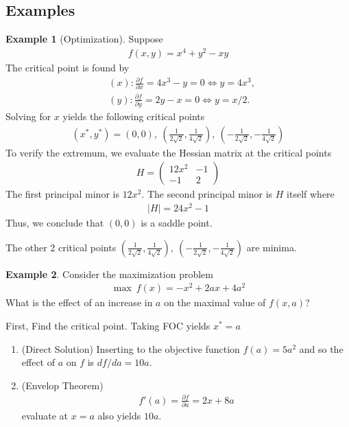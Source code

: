 \documentclass[11pt,a4paper]{book}
\theoremstyle{definition}\newtheorem{definition}{Definition}
\theoremstyle{definition}\newtheorem{fact}{Fact}
\theoremstyle{definition}\newtheorem{remark}{Remark}
\theoremstyle{definition}\newtheorem{ex}{Ex.}
\theoremstyle{definition}\newtheorem{project}{Project}
\theoremstyle{definition}\newtheorem{problem}{Problem}
\theoremstyle{definition}\newtheorem{example}{Example}
\numberwithin{theorem}{section}
\numberwithin{corollary}{chapter}
\numberwithin{assumption}{chapter}
\numberwithin{definition}{chapter}
\numberwithin{prop}{chapter}
\numberwithin{notation}{chapter}
\numberwithin{problem}{chapter}
\numberwithin{example}{chapter}
\numberwithin{fact}{chapter}
\numberwithin{ex}{chapter}
\begin{document}
	\subsection{Examples}
	
	\begin{example}[Optimization]
	\label{ex:soc2}
		Suppose
		\begin{align*}
			f(x,y) = x^4 + y^2 - xy 
		\end{align*}
		The critical point is found by
		\begin{align*}
			& (x): \frac{\partial f}{\partial x} = 4x^3 - y = 0 \iff y  = 4 x^3, \\
			& (y): \frac{\partial f}{\partial y} = 2y - x = 0 \iff y = x/2.      
		\end{align*}
		Solving for $x$ yields the following critical points
		\begin{align*}
			(x^*,y^*) = (0,0), \ (\frac{1}{2\sqrt{2}} , \frac{1}{4\sqrt{2}}  ), \ (-\frac{1}{2\sqrt{2}} , -\frac{1}{4\sqrt{2}}  ) 
		\end{align*}
		To verify the extremum, we evaluate the Hessian matrix at the critical points
		\begin{align*}
			H = \begin{pmatrix}
				12 x^2 & -1 \\
				-1     & 2  
			\end{pmatrix}
		\end{align*}
		The first principal minor is $12x^2$. The second principal minor is $H$ itself where
		\begin{align*}
			| H | = 24 x^2 - 1 
		\end{align*} 
		Thus, we conclude that $(0,0)$ is a saddle point. 
		
		The other 2 critical points $(\frac{1}{2\sqrt{2}} , \frac{1}{4\sqrt{2}}  ), \ (-\frac{1}{2\sqrt{2}} , -\frac{1}{4\sqrt{2}}  )$ are minima.
	\end{example}
	
	\begin{example}
		Consider the maximization problem
		\begin{align*}
			\max \ f(x) = - x^2 + 2ax + 4 a^2 
		\end{align*}
		What is the effect of an increase in $a$ on the maximal value of $f(x,a)$?
		
		First, Find the critical point. Taking FOC yields $x^* = a$
		\begin{enumerate}
			\item (Direct Solution) Inserting to the objective function $f(a) = 5 a^2$ and so the effect of $a$ on $f$ is $df/da = 10a$. \\
			\item (Envelop Theorem) 
			\begin{align*}
				f'(a) = \frac{\partial f}{\partial a} = 2x + 8a 
			\end{align*}
			evaluate at $x=a$ also yields $10a$.
		\end{enumerate}
	\end{example}
	
\end{document}

